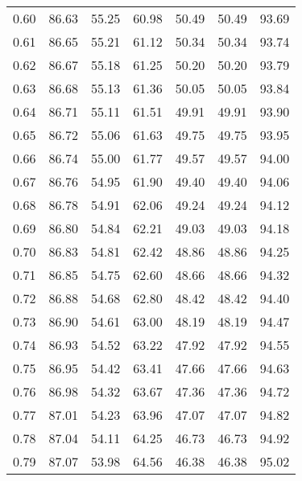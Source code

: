 \begin{tabular}{|c|c|c|c|c|c|c|}
      0.60 &     86.63 &     55.25 &      60.98 &   50.49 &      50.49 &         93.69 \\
      0.61 &     86.65 &     55.21 &      61.12 &   50.34 &      50.34 &         93.74 \\
      0.62 &     86.67 &     55.18 &      61.25 &   50.20 &      50.20 &         93.79 \\
      0.63 &     86.68 &     55.13 &      61.36 &   50.05 &      50.05 &         93.84 \\
      0.64 &     86.71 &     55.11 &      61.51 &   49.91 &      49.91 &         93.90 \\
      0.65 &     86.72 &     55.06 &      61.63 &   49.75 &      49.75 &         93.95 \\
      0.66 &     86.74 &     55.00 &      61.77 &   49.57 &      49.57 &         94.00 \\
      0.67 &     86.76 &     54.95 &      61.90 &   49.40 &      49.40 &         94.06 \\
      0.68 &     86.78 &     54.91 &      62.06 &   49.24 &      49.24 &         94.12 \\
      0.69 &     86.80 &     54.84 &      62.21 &   49.03 &      49.03 &         94.18 \\
      0.70 &     86.83 &     54.81 &      62.42 &   48.86 &      48.86 &         94.25 \\
      0.71 &     86.85 &     54.75 &      62.60 &   48.66 &      48.66 &         94.32 \\
      0.72 &     86.88 &     54.68 &      62.80 &   48.42 &      48.42 &         94.40 \\
      0.73 &     86.90 &     54.61 &      63.00 &   48.19 &      48.19 &         94.47 \\
      0.74 &     86.93 &     54.52 &      63.22 &   47.92 &      47.92 &         94.55 \\
      0.75 &     86.95 &     54.42 &      63.41 &   47.66 &      47.66 &         94.63 \\
      0.76 &     86.98 &     54.32 &      63.67 &   47.36 &      47.36 &         94.72 \\
      0.77 &     87.01 &     54.23 &      63.96 &   47.07 &      47.07 &         94.82 \\
      0.78 &     87.04 &     54.11 &      64.25 &   46.73 &      46.73 &         94.92 \\
      0.79 &     87.07 &     53.98 &      64.56 &   46.38 &      46.38 &         95.02 \\

\end{tabular}

